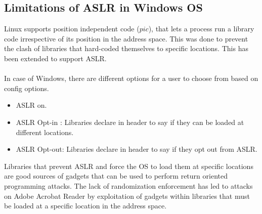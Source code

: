 \documentclass[11pt]{article} %
\begin{document}
\subsection {Limitations of ASLR in Windows OS}
Linux supports position independent code ($pic$), that lets a process run a library
code irrespective of its position in the address space. This was done to prevent
the clash of libraries that hard-coded themselves to specific locations. This
has been extended to support ASLR.\\
\\
In case of Windows, there are different options for a user to choose from based
on config options.
\begin {itemize} \itemsep -2pt
\item ASLR on.
\item ASLR Opt-in : Libraries declare in header to say if they can be loaded at
different locations.
\item ASLR Opt-out: Libraries declare in header to say if they opt out from ASLR.
\end {itemize}

Libraries that prevent ASLR and force the OS to load them at specific locations
are good sources of gadgets that can be used to perform return oriented programming
attacks. The lack of randomization enforcement has led to attacks on Adobe
Acrobat Reader by exploitation of gadgets within libraries that must be loaded at
a specific location in the address space.
\end{document}
